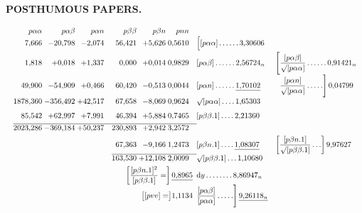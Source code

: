 \par\clearpage
\noindent{}\hfill{\small\textbf{POSTHUMOUS PAPERS.}}\hfill\null\par\medskip

\[
\resizebox{\linewidth}{!}{\(\begin{array}{@{}r@{\;}r@{\;}r@{\quad}r@{\;}r@{\;}r@{\quad}l@{\quad}l@{}}
 p\alpha\alpha&p\alpha\beta&p\alpha n&p\beta\beta&p\beta n&pnn&&\\[1pt]
 7{,}666&-20{,}798&-2{,}074&56{,}421&+5{,}626&0{,}5610&
 \Bigl[[p\alpha\alpha]\,.\,.\,.\,.\,.\,.\,3{,}30606&\\[5pt]
 1{,}818&+0{,}018&+1{,}337&0{,}000&+0{,}014&0{,}9829&
 [p\alpha\beta]\,.\,.\,.\,.\,.\,.\,2{,}56724_{n}&
 \Biggl[\dfrac{[p\alpha\beta]}{\surd[p\alpha\alpha]}\,.\,.\,.\,.\,.\,.\,0{,}91421_{n}\\[5pt]
 49{,}900&-54{,}909&+0{,}466&60{,}420&-0{,}513&0{,}0044&
 [p\alpha n]\,.\,.\,.\,.\,.\,.\,\underline{1{,}70102}&
 \phantom{\Biggl[}\dfrac{[p\alpha n]}{\surd[p\alpha\alpha]}\,.\,.\,.\,.\,.\Biggr]\,0{,}04799\\[5pt]
 1878{,}360&-356{,}492&+42{,}517&67{,}658&-8{,}069&0{,}9624&
 \surd[p\alpha\alpha]\,.\,.\,.\,.\,1{,}65303&\\[7pt]
 85{,}542&+62{,}997&+7{,}991&46{,}394&+5{,}884&0{,}7465&
 [p\beta\beta.1]\,.\,.\,.\,.\,2{,}21360&\\[4pt]
 \cline{1-6}
 2023{,}286&-369{,}184&+50{,}237&230{,}893&+2{,}942&3{,}2572&&\\[4pt]
 &&&67{,}363&-9{,}166&1{,}2473&
 [p\beta n.1]\,.\,.\,.\,.\,\underline{1{,}08307}&
 \left[\dfrac{[p\beta n.1]}{\surd[p\beta\beta.1]}\,.\,.\,.\right]9{,}97627\\[5pt]
 \cline{4-6}
 &&&163{,}530&+12{,}108&2{,}0099&
 \surd[p\beta\beta.1]\,.\,.\,.\,1{,}10680&\\[4pt]
 \multicolumn{6}{r}{\left[\dfrac{[p\beta n.1]^2}{[p\beta\beta.1]}=\right]\underline{0{,}8965}}&
 \mathrm{d}y\,.\,.\,.\,.\,.\,.\,.\,.\,8{,}86947_{n}&\\[5pt]
 \multicolumn{6}{r}{\bigl[[pvv]=\bigr]1{,}1134}&
 \dfrac{[p\alpha\beta]}{[p\alpha\alpha]}\,.\,.\,.\,.\,.\Biggr]\,\underline{9{,}26118_{n}}&
\end{array}\)}
\]

